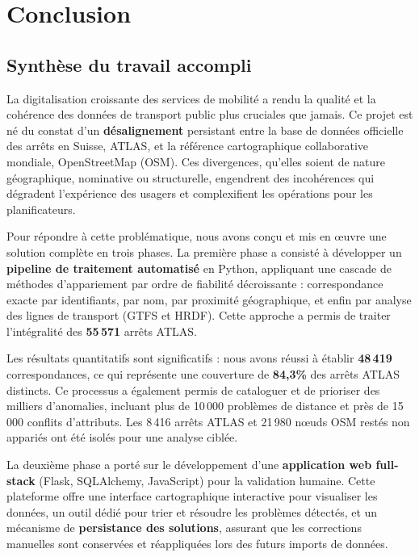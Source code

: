 \chapter*{Conclusion}


\section*{Synthèse du travail accompli}

La digitalisation croissante des services de mobilité a rendu la qualité et la cohérence des données de transport public plus cruciales que jamais. Ce projet est né du constat d'un \textbf{désalignement} persistant entre la base de données officielle des arrêts en Suisse, ATLAS, et la référence cartographique collaborative mondiale, OpenStreetMap (OSM). Ces divergences, qu'elles soient de nature géographique, nominative ou structurelle, engendrent des incohérences qui dégradent l'expérience des usagers et complexifient les opérations pour les planificateurs.

Pour répondre à cette problématique, nous avons conçu et mis en œuvre une solution complète en trois phases. La première phase a consisté à développer un \textbf{pipeline de traitement automatisé} en Python, appliquant une cascade de méthodes d'appariement par ordre de fiabilité décroissante : correspondance exacte par identifiants, par nom, par proximité géographique, et enfin par analyse des lignes de transport (GTFS et HRDF). Cette approche a permis de traiter l'intégralité des \textbf{55\,571} arrêts ATLAS.

Les résultats quantitatifs sont significatifs : nous avons réussi à établir \textbf{48\,419} correspondances, ce qui représente une couverture de \textbf{84,3\%} des arrêts ATLAS distincts. Ce processus a également permis de cataloguer et de prioriser des milliers d'anomalies, incluant plus de 10\,000 problèmes de distance et près de 15\,000 conflits d'attributs. Les 8\,416 arrêts ATLAS et 21\,980 nœuds OSM restés non appariés ont été isolés pour une analyse ciblée.

La deuxième phase a porté sur le développement d'une \textbf{application web full-stack} (Flask, SQLAlchemy, JavaScript) pour la validation humaine. Cette plateforme offre une interface cartographique interactive pour visualiser les données, un outil dédié pour trier et résoudre les problèmes détectés, et un mécanisme de \textbf{persistance des solutions}, assurant que les corrections manuelles sont conservées et réappliquées lors des futurs imports de données.

